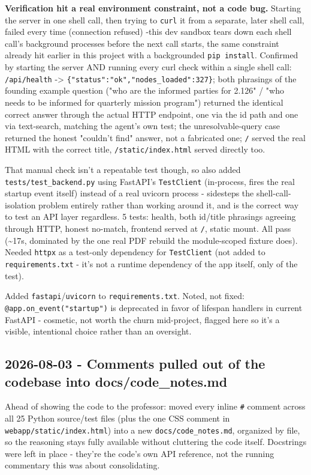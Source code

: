 \textbf{Verification hit a real environment constraint, not a code bug.} Starting the server in one shell call, then trying to \texttt{curl} it from a separate, later shell call, failed every time (connection refused) -this dev sandbox tears down each shell call's background processes before the next call starts, the same constraint already hit earlier in this project with a backgrounded \texttt{pip install}. Confirmed by starting the server AND running every curl check within a single shell call: \texttt{/\allowbreak{}api/\allowbreak{}health} -> \texttt{\{"status":"ok","nodes\_\allowbreak{}loaded":327\}}; both phrasings of the founding example question ("who are the informed parties for 2.126" / "who needs to be informed for quarterly mission program") returned the identical correct answer through the actual HTTP endpoint, one via the id path and one via text-search, matching the agent's own test; the unresolvable-query case returned the honest "couldn't find" answer, not a fabricated one; \texttt{/\allowbreak{}} served the real HTML with the correct title, \texttt{/\allowbreak{}static/\allowbreak{}index.html} served directly too.

That manual check isn't a repeatable test though, so also added \texttt{tests/\allowbreak{}test\_\allowbreak{}backend.py} using FastAPI's \texttt{TestClient} (in-process, fires the real startup event itself) instead of a real uvicorn process - sidesteps the shell-call-isolation problem entirely rather than working around it, and is the correct way to test an API layer regardless. 5 tests: health, both id/title phrasings agreeing through HTTP, honest no-match, frontend served at \texttt{/\allowbreak{}}, static mount. All pass (\textasciitilde{}17s, dominated by the one real PDF rebuild the module-scoped fixture does). Needed \texttt{httpx} as a test-only dependency for \texttt{TestClient} (not added to \texttt{requirements.txt} - it's not a runtime dependency of the app itself, only of the test).

Added \texttt{fastapi}/\texttt{uvicorn} to \texttt{requirements.txt}. Noted, not fixed: \texttt{@app.on\_\allowbreak{}event("startup")} is deprecated in favor of lifespan handlers in current FastAPI - cosmetic, not worth the churn mid-project, flagged here so it's a visible, intentional choice rather than an oversight.

\subsection*{2026-08-03 - Comments pulled out of the codebase into docs/code\_notes.md}
Ahead of showing the code to the professor: moved every inline \texttt{\#} comment across all 25 Python source/test files (plus the one CSS comment in \texttt{webapp/\allowbreak{}static/\allowbreak{}index.html}) into a new \texttt{docs/\allowbreak{}code\_\allowbreak{}notes.md}, organized by file, so the reasoning stays fully available without cluttering the code itself. Docstrings were left in place - they're the code's own API reference, not the running commentary this was about consolidating.

